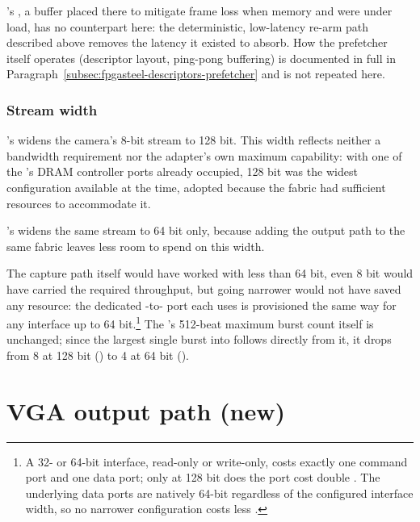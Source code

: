's , a buffer  placed there to mitigate frame loss when memory and  were under load, has no counterpart here: the deterministic, low-latency re-arm path described above removes the latency it existed to absorb. How the prefetcher itself operates (descriptor layout, ping-pong buffering) is documented in full in Paragraph~\ref{subsec:fpgasteel-descriptors-prefetcher} and is not repeated here.

\subsubsection{Stream width}

's  widens the camera's 8-bit  stream to 128 bit. This width reflects neither a bandwidth requirement nor the adapter's own maximum capability: with one of the 's DRAM controller ports already occupied, 128 bit was the widest configuration available at the time, adopted because the fabric had sufficient resources to accommodate it.

's  widens the same stream to 64 bit only, because adding the  output path to the same fabric leaves less room to spend on this width.

The capture path itself would have worked with less than 64 bit, even 8 bit would have carried the required throughput, but going narrower would not have saved any resource: the dedicated -to-  port each  uses is provisioned the same way for any  interface up to 64 bit.\footnote{A 32- or 64-bit  interface, read-only or write-only, costs exactly one command port and one data port; only at 128 bit does the port cost double \cite[Table 12-3, p.~12-6]{CV-TRM}. The underlying data ports are natively 64-bit regardless of the configured interface width, so no narrower configuration costs less \cite[Table 12-2, p.~12-5]{CV-TRM}.} The  's 512-beat maximum burst count itself is unchanged; since the largest single burst into  follows directly from it, it drops from 8  at 128 bit () to 4  at 64 bit ().

\section{VGA output path (new)}
\label{sec:fpgasteel-vga-output}


